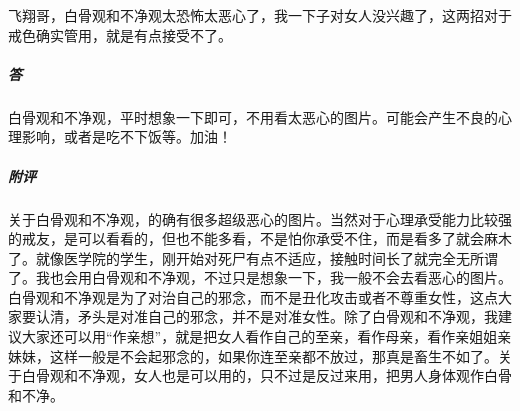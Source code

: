 \begin{case}
    飞翔哥，白骨观和不净观太恐怖太恶心了，我一下子对女人没兴趣了，这两招对于戒色确实管用，就是有点接受不了。
    \subparagraph{答} 白骨观和不净观，平时想象一下即可，不用看太恶心的图片。可能会产生不良的心理影响，或者是吃不下饭等。加油！
    \subparagraph{附评} 关于白骨观和不净观，的确有很多超级恶心的图片。当然对于心理承受能力比较强的戒友，是可以看看的，但也不能多看，不是怕你承受不住，而是看多了就会麻木了。就像医学院的学生，刚开始对死尸有点不适应，接触时间长了就完全无所谓了。我也会用白骨观和不净观，不过只是想象一下，我一般不会去看恶心的图片。白骨观和不净观是为了对治自己的邪念，而不是丑化攻击或者不尊重女性，这点大家要认清，矛头是对准自己的邪念，并不是对准女性。除了白骨观和不净观，我建议大家还可以用“作亲想”，就是把女人看作自己的至亲，看作母亲，看作亲姐姐亲妹妹，这样一般是不会起邪念的，如果你连至亲都不放过，那真是畜生不如了。关于白骨观和不净观，女人也是可以用的，只不过是反过来用，把男人身体观作白骨和不净。
\end{case}

